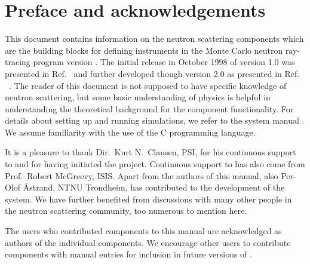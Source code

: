 
\chapter*{Preface and acknowledgements}
This document contains information on the neutron scattering components
which are the building blocks for defining instruments
in the Monte Carlo neutron
ray-tracing program \MCS version \version . The initial
release in October 1998 of version 1.0 was presented in Ref.~\cite{nn_10_20} and further developed though version 2.0 as
presented in Ref. ~\cite{mcs_ppf}.
The reader of this
document is not supposed to have specific knowledge of neutron scattering,
but some basic understanding of physics is helpful in
understanding the theoretical background for the component functionality.
For details about setting up and running simulations, we refer to
the \MCS system manual \cite{mcstasmanual}.
We assume familiarity with the use of
the C programming language.


It is a pleasure to thank Dir.~Kurt N.~Clausen, PSI, for his continuous
support to \MCS and for having initiated the project.
Continuous support to \MCS has also come from Prof.~Robert McGreevy, ISIS.
Apart from the authors of this manual, also Per-Olof \AA strand, NTNU Trondheim,
has contributed to the development of the \MCS system.
We have further benefited
from discussions with many other people in the neutron scattering
community, too numerous to mention here.

The users who contributed components to this manual are acknowledged
as authors of the individual components. We encourage other
users to contribute components with manual entries for inclusion in
future versions of \MCS.


